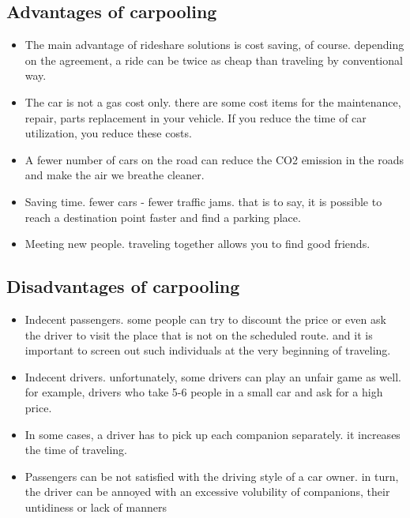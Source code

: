 \subsection{Advantages of carpooling}
\begin{itemize}
\item The main advantage of rideshare solutions is cost saving, of course. depending on the agreement, a ride can be twice as cheap than traveling by conventional way.
\item The car is not a gas cost only. there are some cost items for the maintenance, repair, parts replacement in your vehicle. If you reduce the time of car utilization, you reduce these costs.
\item A fewer number of cars on the road can reduce the CO2 emission in the roads and make the air we breathe cleaner. 
\item Saving time. fewer cars - fewer traffic jams. that is to say, it is possible to reach a destination point faster and find a parking place.
\item Meeting new people. traveling together allows you to find good friends. 
\end{itemize}

\subsection{Disadvantages of carpooling}
\begin{itemize}
\item Indecent passengers. some people can try to discount the price or even ask the driver to visit the place that is not on the scheduled route. and it is important to screen out such individuals at the very beginning of traveling. 
\item Indecent drivers. unfortunately, some drivers can play an unfair game as well. for example, drivers who take 5-6 people in a small car and ask for a high price. 
\item In some cases, a driver has to pick up each companion separately. it increases the time of traveling.
\item Passengers can be not satisfied with the driving style of a car owner. in turn, the driver can be annoyed with an excessive volubility of companions, their untidiness or lack of manners
\end{itemize}